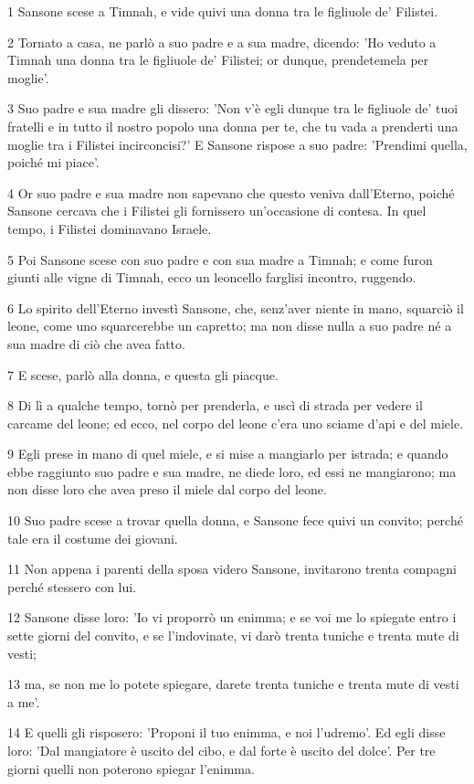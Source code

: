 \par 1 Sansone scese a Timnah, e vide quivi una donna tra le figliuole de' Filistei.
\par 2 Tornato a casa, ne parlò a suo padre e a sua madre, dicendo: 'Ho veduto a Timnah una donna tra le figliuole de' Filistei; or dunque, prendetemela per moglie'.
\par 3 Suo padre e sua madre gli dissero: 'Non v'è egli dunque tra le figliuole de' tuoi fratelli e in tutto il nostro popolo una donna per te, che tu vada a prenderti una moglie tra i Filistei incirconcisi?' E Sansone rispose a suo padre: 'Prendimi quella, poiché mi piace'.
\par 4 Or suo padre e sua madre non sapevano che questo veniva dall'Eterno, poiché Sansone cercava che i Filistei gli fornissero un'occasione di contesa. In quel tempo, i Filistei dominavano Israele.
\par 5 Poi Sansone scese con suo padre e con sua madre a Timnah; e come furon giunti alle vigne di Timnah, ecco un leoncello farglisi incontro, ruggendo.
\par 6 Lo spirito dell'Eterno investì Sansone, che, senz'aver niente in mano, squarciò il leone, come uno squarcerebbe un capretto; ma non disse nulla a suo padre né a sua madre di ciò che avea fatto.
\par 7 E scese, parlò alla donna, e questa gli piacque.
\par 8 Di lì a qualche tempo, tornò per prenderla, e uscì di strada per vedere il carcame del leone; ed ecco, nel corpo del leone c'era uno sciame d'api e del miele.
\par 9 Egli prese in mano di quel miele, e si mise a mangiarlo per istrada; e quando ebbe raggiunto suo padre e sua madre, ne diede loro, ed essi ne mangiarono; ma non disse loro che avea preso il miele dal corpo del leone.
\par 10 Suo padre scese a trovar quella donna, e Sansone fece quivi un convito; perché tale era il costume dei giovani.
\par 11 Non appena i parenti della sposa videro Sansone, invitarono trenta compagni perché stessero con lui.
\par 12 Sansone disse loro: 'Io vi proporrò un enimma; e se voi me lo spiegate entro i sette giorni del convito, e se l'indovinate, vi darò trenta tuniche e trenta mute di vesti;
\par 13 ma, se non me lo potete spiegare, darete trenta tuniche e trenta mute di vesti a me'.
\par 14 E quelli gli risposero: 'Proponi il tuo enimma, e noi l'udremo'. Ed egli disse loro: 'Dal mangiatore è uscito del cibo, e dal forte è uscito del dolce'. Per tre giorni quelli non poterono spiegar l'enimma.

